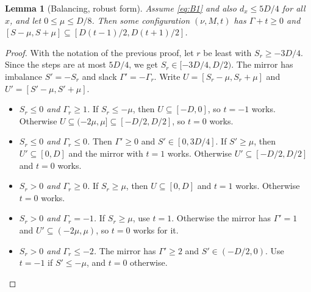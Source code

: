 \documentclass[11pt]{article}
\newtheorem{lemma}[theorem]{Lemma}
\theoremstyle{definition}
\begin{document}
\begin{lemma}[Balancing, robust form]\label{lem:bal-robust}
Assume \eqref{eq:B1} and also $d_x\le5D/4$ for all $x$, and let $0\le\mu\le D/8$. Then some configuration $(\nu,M,t)$ has $\Gamma+t\ge0$ and $[S-\mu,S+\mu]\subseteq[D(t-1)/2,D(t+1)/2]$.
\end{lemma}

\begin{proof}
With the notation of the previous proof, let $r$ be least with $S_r\ge-3D/4$. Since the steps are at most $5D/4$, we get $S_r\in[-3D/4,D/2)$. The mirror has imbalance $S'=-S_r$ and slack $\Gamma'=-\Gamma_r$. Write $U=[S_r-\mu,S_r+\mu]$ and $U'=[S'-\mu,S'+\mu]$.
\begin{itemize}[nosep]
\item \emph{$S_r\le0$ and $\Gamma_r\ge1$.} If $S_r\le-\mu$, then $U\subseteq[-D,0]$, so $t=-1$ works. Otherwise $U\subseteq(-2\mu,\mu]\subseteq[-D/2,D/2]$, so $t=0$ works.
\item \emph{$S_r\le0$ and $\Gamma_r\le0$.} Then $\Gamma'\ge0$ and $S'\in[0,3D/4]$. If $S'\ge\mu$, then $U'\subseteq[0,D]$ and the mirror with $t=1$ works. Otherwise $U'\subseteq[-D/2,D/2]$ and $t=0$ works.
\item \emph{$S_r>0$ and $\Gamma_r\ge0$.} If $S_r\ge\mu$, then $U\subseteq[0,D]$ and $t=1$ works. Otherwise $t=0$ works.
\item \emph{$S_r>0$ and $\Gamma_r=-1$.} If $S_r\ge\mu$, use $t=1$. Otherwise the mirror has $\Gamma'=1$ and $U'\subseteq(-2\mu,\mu)$, so $t=0$ works for it.
\item \emph{$S_r>0$ and $\Gamma_r\le-2$.} The mirror has $\Gamma'\ge2$ and $S'\in(-D/2,0)$. Use $t=-1$ if $S'\le-\mu$, and $t=0$ otherwise.\qedhere
\end{itemize}
\end{proof}
\end{document}
